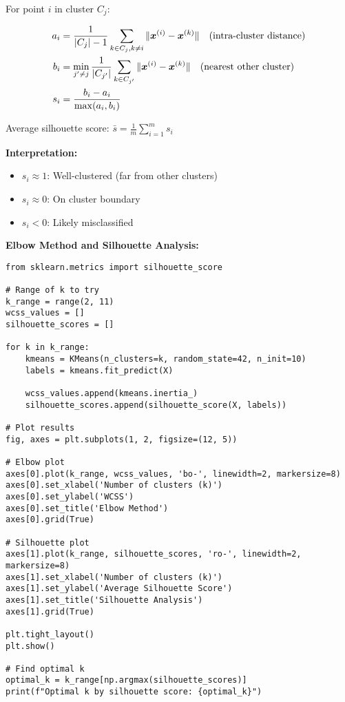 \begin{definition}
For point $i$ in cluster $C_j$:

\begin{align}
    a_i &= \frac{1}{|C_j| - 1} \sum_{k \in C_j, k \neq i} \|\bm{x}^{(i)} - \bm{x}^{(k)}\| \quad \text{(intra-cluster distance)} \\
    b_i &= \min_{j' \neq j} \frac{1}{|C_{j'}|} \sum_{k \in C_{j'}} \|\bm{x}^{(i)} - \bm{x}^{(k)}\| \quad \text{(nearest other cluster)} \\
    s_i &= \frac{b_i - a_i}{\max(a_i, b_i)}
\end{align}

Average silhouette score: $\bar{s} = \frac{1}{m} \sum_{i=1}^m s_i$

\textbf{Interpretation:}
\begin{itemize}
    \item $s_i \approx 1$: Well-clustered (far from other clusters)
    \item $s_i \approx 0$: On cluster boundary
    \item $s_i < 0$: Likely misclassified
\end{itemize}
\end{definition}

\begin{codebox}
\textbf{Elbow Method and Silhouette Analysis:}

\begin{lstlisting}
from sklearn.metrics import silhouette_score

# Range of k to try
k_range = range(2, 11)
wcss_values = []
silhouette_scores = []

for k in k_range:
    kmeans = KMeans(n_clusters=k, random_state=42, n_init=10)
    labels = kmeans.fit_predict(X)
    
    wcss_values.append(kmeans.inertia_)
    silhouette_scores.append(silhouette_score(X, labels))

# Plot results
fig, axes = plt.subplots(1, 2, figsize=(12, 5))

# Elbow plot
axes[0].plot(k_range, wcss_values, 'bo-', linewidth=2, markersize=8)
axes[0].set_xlabel('Number of clusters (k)')
axes[0].set_ylabel('WCSS')
axes[0].set_title('Elbow Method')
axes[0].grid(True)

# Silhouette plot
axes[1].plot(k_range, silhouette_scores, 'ro-', linewidth=2, markersize=8)
axes[1].set_xlabel('Number of clusters (k)')
axes[1].set_ylabel('Average Silhouette Score')
axes[1].set_title('Silhouette Analysis')
axes[1].grid(True)

plt.tight_layout()
plt.show()

# Find optimal k
optimal_k = k_range[np.argmax(silhouette_scores)]
print(f"Optimal k by silhouette score: {optimal_k}")
\end{lstlisting}
\end{codebox}

